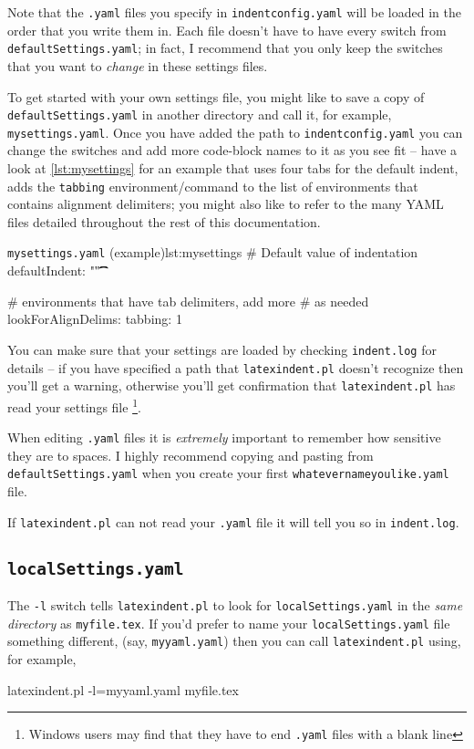 Note that the \texttt{.yaml} files you specify in \texttt{indentconfig.yaml}
 will be loaded in the order that you write them in. Each file doesn't have
 to have every switch from \texttt{defaultSettings.yaml}; in fact, I recommend
 that you only keep the switches that you want to \emph{change} in these
 settings files.

 To get started with your own settings file, you might like to save a copy of
 \texttt{defaultSettings.yaml} in another directory and call it, for
 example, \texttt{mysettings.yaml}. Once you have added the path to \texttt{indentconfig.yaml}
 you can change the switches and add more code-block names to it
 as you see fit -- have a look at \cref{lst:mysettings} for an example
 that uses four tabs for the default indent, adds the \texttt{tabbing}
 environment/command to the list of environments that contains alignment delimiters; you might also like to
 refer to the many YAML files detailed throughout the rest of this documentation.

 \begin{yaml}{\texttt{mysettings.yaml} (example)}{lst:mysettings}
# Default value of indentation
defaultIndent: "\t\t\t\t"

# environments that have tab delimiters, add more
# as needed
lookForAlignDelims:
    tabbing: 1
\end{yaml}

 You can make sure that your settings are loaded by checking \texttt{indent.log}
 for details -- if you have specified a path that \texttt{latexindent.pl} doesn't
 recognize then you'll get a warning, otherwise you'll get confirmation that
 \texttt{latexindent.pl} has read your settings file \footnote{Windows users
	 may find that they have to end \texttt{.yaml} files with a blank line}.

 \begin{warning}
	 When editing \texttt{.yaml} files it is \emph{extremely} important
	 to remember how sensitive they are to spaces. I highly recommend copying
	 and pasting from \texttt{defaultSettings.yaml} when you create your
	 first \texttt{whatevernameyoulike.yaml} file.

	 If \texttt{latexindent.pl} can not read your \texttt{.yaml} file it
	 will tell you so in \texttt{indent.log}.
 \end{warning}

\subsection{\texttt{localSettings.yaml}}\label{sec:localsettings}
	The \texttt{-l} switch tells \texttt{latexindent.pl} to look for \texttt{localSettings.yaml} in the
	\emph{same directory} as \texttt{myfile.tex}.  If you'd prefer to name your \texttt{localSettings.yaml} file something 
    different, (say, \texttt{myyaml.yaml}) then
	you can call \texttt{latexindent.pl} using, for example,
	\begin{commandshell}
latexindent.pl -l=myyaml.yaml myfile.tex
\end{commandshell}

